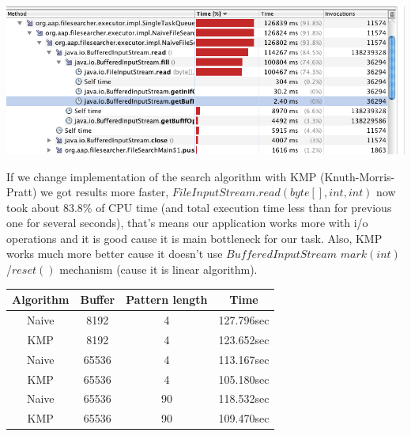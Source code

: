 \documentclass[a4paper,12pt,final]{article}
\begin{document}
\begin{center}
\includegraphics[width=16cm]{0Threads_Naive_11549_Profiling.png}
\end{center}

If we change implementation of the search algorithm with KMP (Knuth-Morris-Pratt) we got results more faster, $FileInputStream.read(byte[],int,int)$ now took about 83.8\% of CPU time (and total execution time less than for previous one for several seconds), that's means our application works more with i/o operations and it is good cause it is main bottleneck for our task. Also, KMP works much more better cause it doesn't use $BufferedInputStream$ $mark(int)$/$reset()$ mechanism (cause it is linear algorithm).




\begin{center}
\begin{tabular}{|c|c|c|c|}
\hline
Algorithm & Buffer &  Pattern length  & Time \\
\hline
\hline

Naive & 8192 & 4 & 127.796sec \\
\hline

KMP & 8192 & 4 & 123.652sec \\
\hline

Naive & 65536 & 4 & 113.167sec \\
\hline

KMP & 65536 & 4 & 105.180sec \\
\hline

Naive & 65536 & 90 & 118.532sec \\
\hline

KMP & 65536 & 90 & 109.470sec \\
\hline
\end{tabular}
\end{center}
\end{document}
